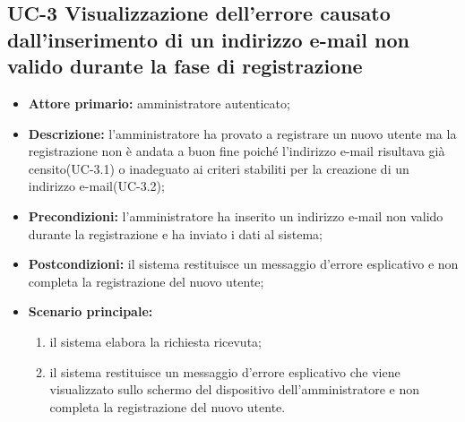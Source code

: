 \subsection{UC-3 Visualizzazione dell'errore causato dall'inserimento di un indirizzo e-mail non valido durante la fase di registrazione}
\begin{itemize}
	\item \textbf{Attore primario:} amministratore autenticato;

	\item \textbf{Descrizione:} l'amministratore ha provato a registrare un nuovo utente ma la registrazione non è andata a buon fine poiché l'indirizzo e-mail risultava già censito(UC-3.1) o inadeguato ai criteri stabiliti per la creazione di un indirizzo e-mail(UC-3.2);

	\item \textbf{Precondizioni:} l'amministratore ha inserito un indirizzo e-mail non valido durante la registrazione e ha inviato i dati al sistema;

	\item \textbf{Postcondizioni:} il sistema restituisce un messaggio d'errore esplicativo e non completa la registrazione del nuovo utente;

	\item \textbf{Scenario principale:}
	\begin{enumerate}
   		 \item il sistema elabora la richiesta ricevuta;
   		 \item il sistema restituisce un messaggio d'errore esplicativo che viene visualizzato sullo schermo del dispositivo dell'amministratore e non completa la registrazione del nuovo utente.
	\end{enumerate}
\end{itemize}


